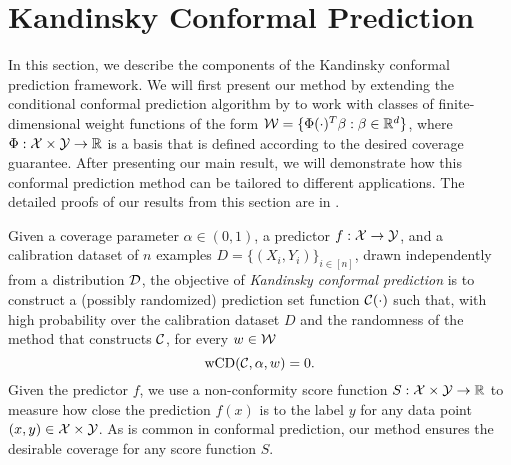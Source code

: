 \section{Kandinsky Conformal Prediction}
\begin{comment}
Content:
\begin{enumerate}
    \item Algorithms for shift captured by $g(x,y)$,  an extension of the algorithm by UPenn 
    \item Results when $g(x,y)$ has finite dimension
    \item Applications of this type of distribution shift:
    \begin{itemize}
        \item group conditional guarantees
        \item concept shift
        \item class conditional guarantees
        \item combine the above
        \item groups defined on both x and y
    \end{itemize}
\end{enumerate}
\end{comment}

\label{sec:algorithm}
In this section, we describe the components of the Kandinsky conformal prediction framework. We will first present our method by extending the conditional conformal prediction algorithm by \citet{JNRR2023} to work with classes of finite-dimensional weight functions of the form ${\cal W} = \{\Phi(\cdot)^T \beta : \beta \in \mathbb{R}^d\}$, where $\Phi:{\cal X} \times {\cal Y} \to \mathbb{R}$ is a basis that is defined according to the desired coverage guarantee. After presenting our main result, we will demonstrate how this conformal prediction method can be tailored to different applications. The detailed proofs of our results from this section are in .

 Given a coverage parameter $\alpha \in (0,1)$, a predictor $f:{\cal X} \to {\cal Y}$, and a calibration dataset of $n$ examples $D = \{(X_i,Y_i)\}_{i\in [n]}$, drawn independently from a distribution ${\cal D}$, the objective of \textit{Kandinsky conformal prediction} is to construct a (possibly randomized) prediction set function ${\cal C}(\cdot)$ such that, with high probability over the calibration dataset $D$ and the randomness of the method that constructs ${\cal C}$, for every $w \in \cal W$
\begin{equation*}
\text{wCD}({\cal C}, \alpha, w)= 0.
\end{equation*}
Given the predictor $f$, we use a non-conformity score function $S:{\cal X} \times {\cal Y} \to \mathbb{R}$ to measure how close the prediction $f(x)$ is to the label $y$ for any data point $(x,y) \in {\cal X} \times {\cal Y}$. As is common in conformal prediction, our method ensures the desirable coverage for any score function $S$.

